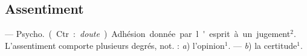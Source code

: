 \subsection{Assentiment}
 — \si{Psycho.} (Ctr. : {\it doute}).
Adhésion donnée par l'esprit à un
jugement$^2$. L’assentiment comporte
plusieurs degrés, not. : {\it a}) l'opinion$^1$.
— {\it b}) la certitude$^1$.

